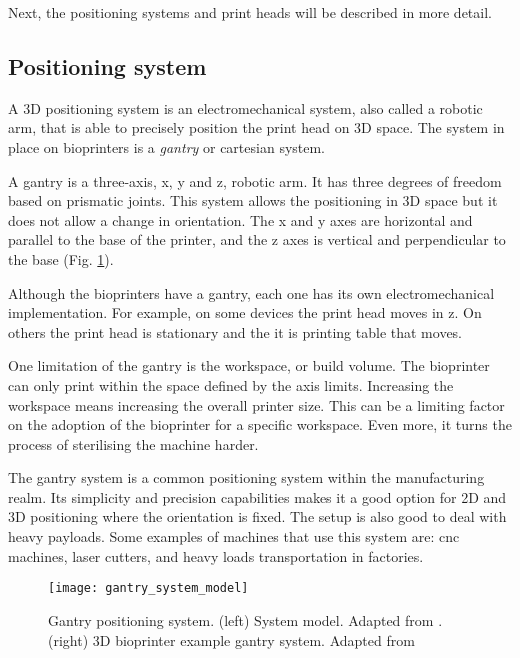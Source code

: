 Next, the positioning systems and print heads will be described in more detail.

\subsection{Positioning system}
\label{subsec:positioning_system}

A 3D positioning system is an electromechanical system, also called a robotic arm, that is able to precisely position the print head on 3D space. The system in place on bioprinters is a \emph{gantry} or cartesian system.

A gantry is a three-axis, x, y and z, robotic arm. It has three degrees of freedom based on prismatic joints. This system allows the positioning in 3D space but it does not allow a change in orientation. The x and y axes are horizontal and parallel to the base of the printer, and the z axes is vertical and perpendicular to the base (Fig. \ref{fig:gantry_system}).

Although the bioprinters have a gantry, each one has its own electromechanical implementation. For example, on some devices the print head moves in z. On others the print head is stationary and the it is printing table that moves.

One limitation of the gantry is the workspace, or build volume. The bioprinter can only print within the space defined by the axis limits. Increasing the workspace means increasing the overall printer size. This can be a limiting factor on the adoption of the bioprinter for a specific workspace. Even more, it turns the process of sterilising the machine harder. 

The gantry system is a common positioning system within the manufacturing realm. Its simplicity and precision capabilities makes it a good option for 2D and 3D positioning where the orientation is fixed. The setup is also good to deal with heavy payloads. Some examples of machines that use this system are: \gls{cnc} machines, laser cutters, and heavy loads transportation in factories.

\begin{figure}[htbp]
	\centering
	\texttt{[image: gantry\_system\_model]}
	\hspace{.1in}
	\caption[Gantry positioning system.]{Gantry positioning system. (left) System model. Adapted from \cite{Siciliano2009_robotics_modelling_planning_control}. (right) 3D bioprinter example gantry system. Adapted from \cite{ONeill2017_3d_bioprinting_directly_onto_moving_human_anatomy}}
	\label{fig:gantry_system}
\end{figure}

